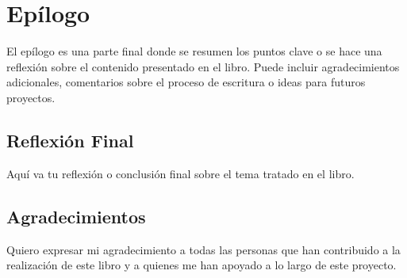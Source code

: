 
\chapter*{Epílogo}

El epílogo es una parte final donde se resumen los puntos clave o se hace una reflexión sobre el contenido presentado en el libro. Puede incluir agradecimientos adicionales, comentarios sobre el proceso de escritura o ideas para futuros proyectos.

\section*{Reflexión Final}
Aquí va tu reflexión o conclusión final sobre el tema tratado en el libro.

\section*{Agradecimientos}
Quiero expresar mi agradecimiento a todas las personas que han contribuido a la realización de este libro y a quienes me han apoyado a lo largo de este proyecto.

